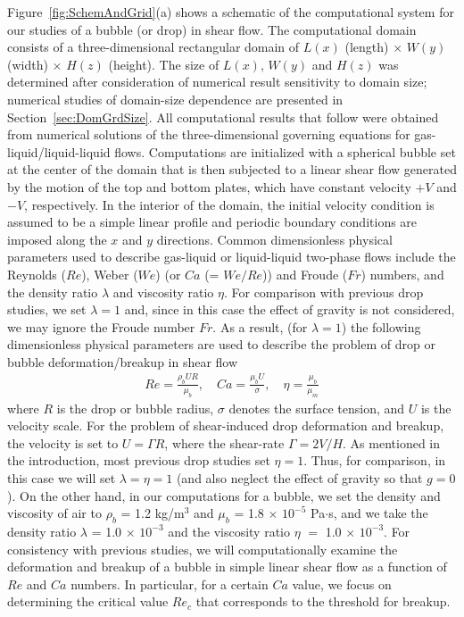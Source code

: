 \documentclass[%
 reprint,
 showkeys,
 amsmath,amssymb,
 aps,
 prfluids,
 onecolumn
]{revtex4-2}
\begin{document}
Figure~\ref{fig:SchemAndGrid}(a) shows a schematic of the computational system
for our studies of a bubble (or drop) in shear flow.  The computational domain
consists of a three-dimensional rectangular domain of $L(x)$ (length) $\times$
$W(y)$ (width) $\times$ $H(z)$ (height).  The size of $L(x)$, $W(y)$ and $H(z)$
was determined after consideration of numerical result sensitivity to domain
size; numerical studies of domain-size dependence are presented in
Section~\ref{sec:DomGrdSize}.  All computational results that follow were
obtained from numerical solutions of the three-dimensional governing equations
for gas-liquid/liquid-liquid flows.  Computations are initialized with a
spherical bubble set at the center of the domain that is then subjected to a
linear shear flow generated by the motion of the top and bottom plates, which 
have constant velocity $+V$ and $-V$, respectively.  In the interior of the
domain, the initial velocity condition is assumed to be a simple linear profile
and periodic boundary conditions are imposed along the $x$ and $y$ directions.
Common dimensionless physical parameters used to describe gas-liquid or
liquid-liquid two-phase flows include the Reynolds ($Re$), Weber ($We$) (or
$Ca$ (= $We/Re$)) and Froude ($Fr$) numbers, and the density ratio $\lambda$
and viscosity ratio $\eta$.  For comparison with previous drop studies, we set
$\lambda=1$ and, since in this case the effect of gravity is not considered, we
may ignore the Froude number $Fr$.  As a result, (for $\lambda=1$) the
following dimensionless physical parameters are used to describe the problem of
drop or bubble deformation/breakup in shear flow
%
\begin{eqnarray}\label{dimensonless}
  Re = \frac{\rho_{b}UR}{\mu_{b}}, \quad
  Ca = \frac{\mu_{b}U}{\sigma}, \quad
  \eta = \frac{\mu_{b}}{\mu_{m}}
\end{eqnarray} 
%
where $R$ is the drop or bubble radius, $\sigma$ denotes the surface tension,
and $U$ is the velocity scale. For the problem of shear-induced drop
deformation and breakup, the velocity is set to $U = \mathit{\Gamma} R$, where
the shear-rate $\mathit{\Gamma} = 2V/H$.  As mentioned in the introduction,
most previous drop studies set $\eta = 1$. Thus, for comparison, in this case
we will set $\lambda = \eta = 1$ (and also neglect the effect of gravity so
that $g=0$). On the other hand, in our computations for a bubble, we set the
density and viscosity of air to $\rho_{b}$ = 1.2 kg/m$^{3}$ and $\mu_{b}$ = 1.8
$\times$ $10^{-5}$ Pa$\cdot$s, and we take the 
density ratio 
$\lambda$ = 1.0 $\times$ $10^{-3}$ 
and the 
viscosity ratio 
$\eta$ $=$ 1.0 $\times$ $10^{-3}$.
For consistency with previous studies, we will computationally examine the
deformation and breakup of a bubble in simple linear shear flow as a
function of $Re$ and $Ca$ numbers.  In particular, 
for a certain $Ca$ value, we
focus on determining the critical value 
$Re_{c}$ that corresponds to the threshold
for breakup.
\end{document}
